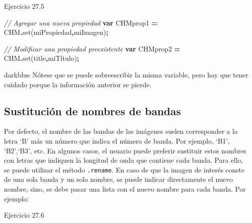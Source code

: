 \documentclass[
  12pt,
  letterpaper,
  twoside]{book}
\newenvironment{Shaded}{\begin{snugshade}}{\end{snugshade}}
\newcommand{\CommentTok}[1]{\textcolor[rgb]{0.56,0.35,0.01}{\textit{#1}}}
\newcommand{\FunctionTok}[1]{\textcolor[rgb]{0.00,0.00,0.00}{#1}}
\newcommand{\KeywordTok}[1]{\textcolor[rgb]{0.13,0.29,0.53}{\textbf{#1}}}
\newcommand{\NormalTok}[1]{#1}
\newcommand{\OperatorTok}[1]{\textcolor[rgb]{0.81,0.36,0.00}{\textbf{#1}}}
\newcommand{\StringTok}[1]{\textcolor[rgb]{0.31,0.60,0.02}{#1}}
\begin{document}
Ejercicio 27.5

\begin{Shaded}
\begin{Highlighting}[]
\CommentTok{// Agregar una nueva propiedad}
\KeywordTok{var}\NormalTok{ CHMprop1 }\OperatorTok{=}\NormalTok{ CHM}\OperatorTok{.}\FunctionTok{set}\NormalTok{(}\StringTok{\textquotesingle{}miPropiedad\textquotesingle{}}\OperatorTok{,}\StringTok{\textquotesingle{}miImagen\textquotesingle{}}\NormalTok{)}\OperatorTok{;}

\CommentTok{// Modificar una propiedad preexistente}
\KeywordTok{var}\NormalTok{ CHMprop2 }\OperatorTok{=}\NormalTok{ CHM}\OperatorTok{.}\FunctionTok{set}\NormalTok{(}\StringTok{\textquotesingle{}title\textquotesingle{}}\OperatorTok{,}\StringTok{\textquotesingle{}miTítulo\textquotesingle{}}\NormalTok{)}\OperatorTok{;}
\end{Highlighting}
\end{Shaded}

\begin{bluebox2}

\begin{awesomeblock}{5pt}{\faLightbulb}{darkblue}
Nótese que se puede sobreescribir la misma variable, pero hay que tener cuidado porque la información anterior se pierde.

\end{awesomeblock}

\end{bluebox2}

\hypertarget{sustituciuxf3n-de-nombres-de-bandas}{%
\subsection{Sustitución de nombres de bandas}\label{sustituciuxf3n-de-nombres-de-bandas}}

Por defecto, el nombre de las bandas de las imágenes suelen corresponder a la letra `B' más un número que indica el número de banda. Por ejemplo, `B1', `B2',`B3', etc. En algunos casos, el usuario puede preferir sustituir estos nombres con letras que indiquen la longitud de onda que contiene cada banda. Para ello, se puede utilizar el método \texttt{.rename}. En caso de que la imagen de interés conste de una sola banda y un solo nombre, se puede indicar directamente el nuevo nombre, sino, se debe pasar una lista con el nuevo nombre para cada banda. Por ejemplo:

Ejercicio 27.6
\end{document}
